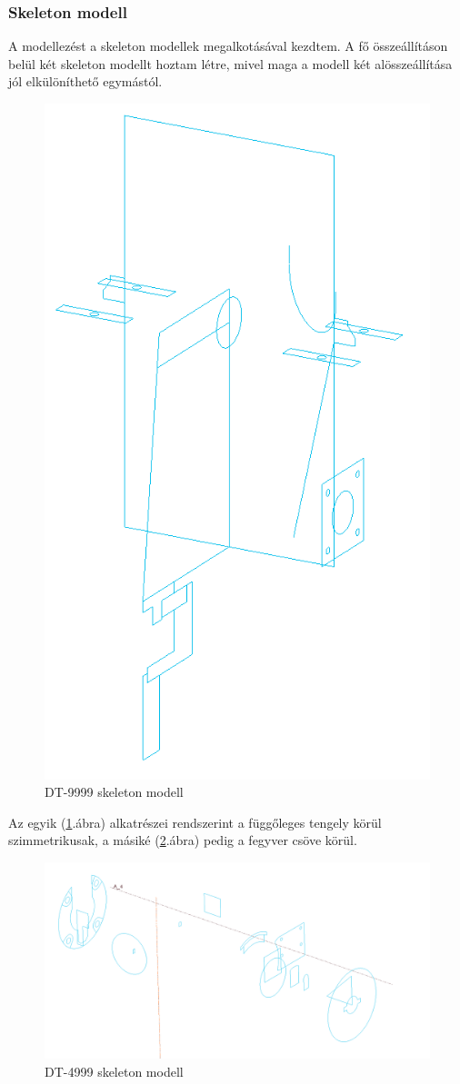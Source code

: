 \documentclass[12pt,a4paper]{article}
\begin{document}
\subsubsection*{Skeleton modell}
A modellezést a skeleton modellek megalkotásával kezdtem. A fő összeállításon belül két skeleton modellt hoztam létre, mivel maga a modell két alösszeállítása jól elkülöníthető egymástól.

\begin{figure}[h!]
	\centering
	\includegraphics[width=0.5\linewidth]{mech_skeleton1}
	\caption{DT-9999 skeleton modell}
	\label{fig:mech_skeleton1}
\end{figure}

Az egyik (\ref{fig:mech_skeleton1}.ábra) alkatrészei rendszerint a függőleges tengely körül szimmetrikusak, a másiké (\ref{fig:mech_skeleton2}.ábra) pedig a fegyver csöve körül.

\begin{figure}[h!]
	\centering
	\includegraphics[width=1\linewidth]{mech_skeleton2}
	\caption{DT-4999 skeleton modell}
	\label{fig:mech_skeleton2}
\end{figure}
\end{document}

